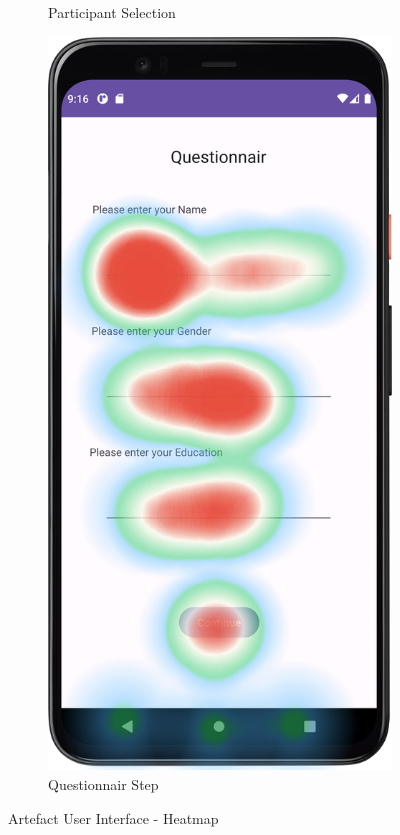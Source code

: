 \begin{figure}[htbp]
\begin{subfigure}[b]{0.25\textwidth}
        \caption{Participant Selection}
        \label{subfig:heatmapB}
    \end{subfigure}
        \hspace{1cm}
    \begin{subfigure}[b]{0.25\textwidth}
        \centering
        \includegraphics[width=\textwidth]{content/07_evaluation_of_the_solution/HeatMap_QuestionnairScreen.png}
        \caption{Questionnair Step}
        \label{subfig:heatmapC}
    \end{subfigure}
       \caption{Artefact User Interface - Heatmap}
       \label{fig:heatmaps}
\end{figure}

